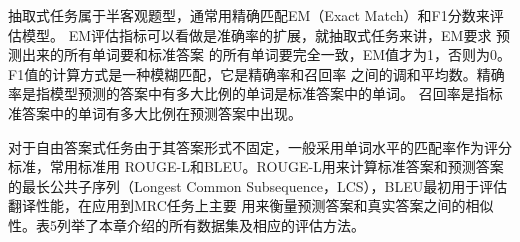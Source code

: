 抽取式任务属于半客观题型，通常用精确匹配EM（Exact Match）和F1分数来评估模型。
EM评估指标可以看做是准确率的扩展，就抽取式任务来讲，EM要求
预测出来的所有单词要和标准答案
的所有单词要完全一致，EM值才为1，否则为0。
F1值的计算方式是一种模糊匹配，它是精确率和召回率
之间的调和平均数。精确率是指模型预测的答案中有多大比例的单词是标准答案中的单词。
召回率是指标准答案中的单词有多大比例在预测答案中出现。


对于自由答案式任务由于其答案形式不固定，一般采用单词水平的匹配率作为评分标准，常用标准用
ROUGE-L和BLEU。ROUGE-L用来计算标准答案和预测答案的最长公共子序列（Longest Common Subsequence，LCS），BLEU最初用于评估翻译性能，在应用到MRC任务上主要
用来衡量预测答案和真实答案之间的相似性。表5列举了本章介绍的所有数据集及相应的评估方法。



